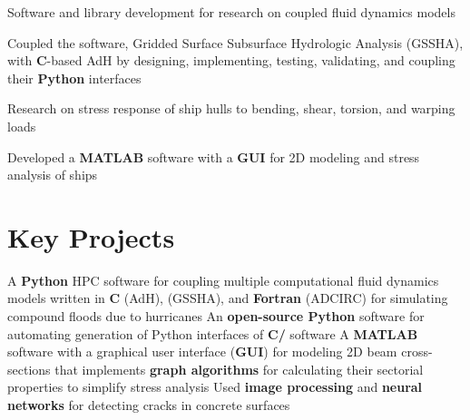 \documentclass[letterpaper,10pt]{article}
\begin{document}

       \resumeItemListStart
            {Software and library development for research on coupled
            fluid dynamics models}

            {Coupled the \textbf{\CC{}} software, Gridded Surface Subsurface
            Hydrologic Analysis (GSSHA), with \textbf{C}-based AdH by
            designing, implementing, testing, validating, and coupling their
            \textbf{Python} interfaces}
       \resumeItemListEnd


        \resumeItemListStart
            {Research on stress response of ship hulls to bending, shear,
            torsion, and warping loads}

            {Developed a \textbf{MATLAB} software with a \textbf{GUI} for 2D
            modeling and stress analysis of ships}
        \resumeItemListEnd
  \resumeSubHeadingListEnd

\section{Key Projects}
  \resumeSubItemListStart
      {A \textbf{Python} HPC software for coupling multiple computational fluid
      dynamics models written in \textbf{C} (AdH), \textbf{\CC{}} (GSSHA), and
      \textbf{Fortran} (ADCIRC) for simulating compound floods due to hurricanes}
      {An \textbf{open-source Python} software for automating
      generation of Python interfaces of \textbf{C/\CC{}} software}
      {A \textbf{MATLAB} software with a graphical user interface (\textbf{GUI})
      for modeling 2D beam cross-sections that implements \textbf{graph
      algorithms} for calculating their sectorial properties to simplify stress
      analysis}
      {Used \textbf{image processing} and \textbf{neural networks} for detecting
      cracks in concrete surfaces}
  \resumeSubItemListEnd
\end{document}
